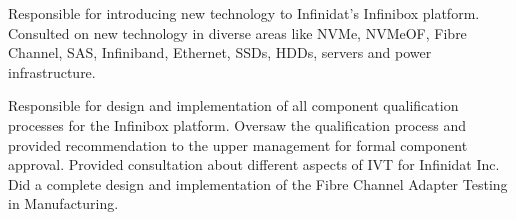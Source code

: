 \documentclass[10pt,a4paper,sans]{moderncv}
\begin{document}
\begin{samepage}
 {Responsible for introducing new technology to Infinidat's
        Infinibox platform. Consulted on new technology in diverse areas like NVMe, NVMeOF, Fibre Channel,
    SAS, Infiniband, Ethernet, SSDs, HDDs, servers and power infrastructure.}
\end{samepage}
 {Responsible for design and implementation of all 
        component qualification processes for the Infinibox platform. Oversaw the qualification process
    and provided recommendation to the upper management for formal component approval.}
 {Provided consultation about different aspects of IVT for
            Infinidat Inc. Did a complete design and implementation of the Fibre Channel Adapter Testing in
        Manufacturing.}

\end{document}
